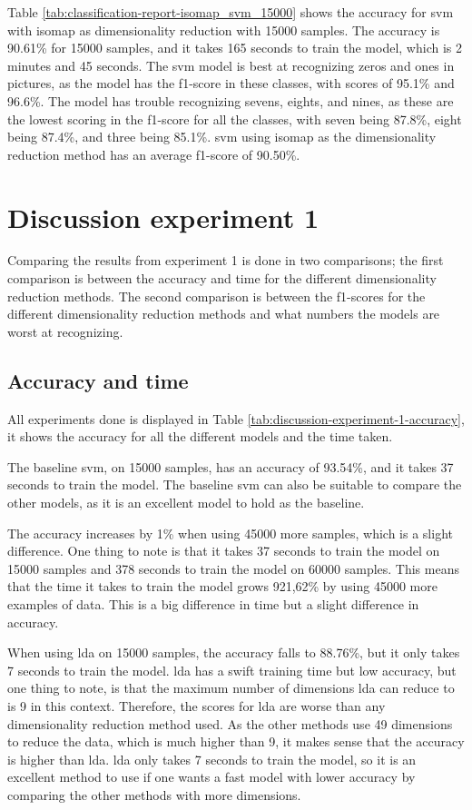 Table \ref{tab:classification-report-isomap_svm_15000} shows the accuracy for \gls{svm} with \gls{isomap} as dimensionality reduction with 15000 samples. The accuracy is 90.61\% for 15000 samples, and it takes 165 seconds to train the model, which is 2 minutes and 45 seconds. The \gls{svm} model is best at recognizing zeros and ones in pictures, as the model has the f1-score in these classes, with scores of 95.1\% and 96.6\%. The model has trouble recognizing sevens, eights, and nines, as these are the lowest scoring in the f1-score for all the classes, with seven being 87.8\%, eight being 87.4\%, and three being 85.1\%. \gls{svm} using \gls{isomap} as the dimensionality reduction method has an average f1-score of 90.50\%.

\section{Discussion experiment 1}\label{sec:discussion-experiment-1}
Comparing the results from experiment 1 is done in two comparisons; the first comparison is between the accuracy and time for the different dimensionality reduction methods. The second comparison is between the f1-scores for the different dimensionality reduction methods and what numbers the models are worst at recognizing. 

\subsection{Accuracy and time}\label{subsec:discussion-experiment-1-accuracy}
All experiments done is displayed in Table \ref{tab:discussion-experiment-1-accuracy}, it shows the accuracy for all the different models and the time taken.


The baseline \gls{svm}, on 15000 samples, has an accuracy of 93.54\%, and it takes 37 seconds to train the model. The baseline \gls{svm} can also be suitable to compare the other models, as it is an excellent model to hold as the baseline.

The accuracy increases by 1\% when using 45000 more samples, which is a slight difference. One thing to note is that it takes 37 seconds to train the model on 15000 samples and 378 seconds to train the model on 60000 samples. This means that the time it takes to train the model grows 921,62\% by using 45000 more examples of data. This is a big difference in time but a slight difference in accuracy.

When using \gls{lda} on 15000 samples, the accuracy falls to 88.76\%, but it only takes 7 seconds to train the model. \gls{lda} has a swift training time but low accuracy, but one thing to note, is that the maximum number of dimensions \gls{lda} can reduce to is 9 in this context. Therefore, the scores for \gls{lda} are worse than any dimensionality reduction method used. As the other methods use 49 dimensions to reduce the data, which is much higher than 9, it makes sense that the accuracy is higher than \gls{lda}. \gls{lda} only takes 7 seconds to train the model, so it is an excellent method to use if one wants a fast model with lower accuracy by comparing the other methods with more dimensions. 

